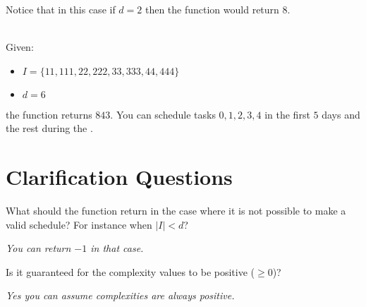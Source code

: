 \begin{exercise}
\begin{example}
        Notice that in this case if $d = 2$ then the function would return $8$.
    \end{example}

    \begin{example}
        \hfill \\
        Given:
        \begin{itemize}
            \item $I = \{11,111,22,222,33,333,44,444\}$
            \item $d = 6$
        \end{itemize}
        the function returns $843$. You can schedule tasks $0,1,2,3,4$ in the first $5$ days and the
        rest during the .
        
    \end{example}
\end{exercise}



\section{Clarification Questions}
        
    \begin{QandA}
        \begin{questionitem} \begin{question} What should the function return in the case where it is not possible to make a
            valid schedule? For instance when $|I| < d$?
        \end{question} 
        \begin{answered}
            \textit{You can return $-1$ in that case.}
        \end{answered} \end{questionitem}

        \begin{questionitem} \begin{question} Is it guaranteed for the complexity values to be positive ($\geq 0$)?  \end{question}          
    \begin{answered}
            \textit{Yes you can assume complexities are always positive.}
        \end{answered} \end{questionitem}
    \end{QandA}

